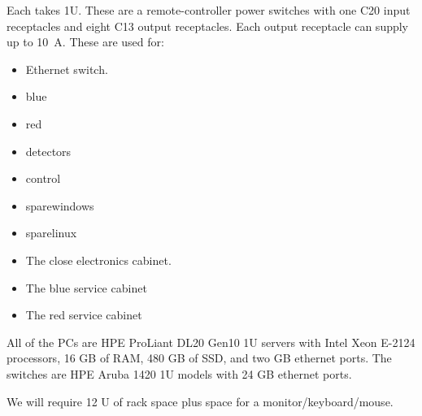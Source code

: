\documentclass{article}
\begin{document}
\begin{itemize}
Each takes 1U. These are a remote-controller power switches with one C20 input receptacles and eight C13 output receptacles.
Each output receptacle can supply up to 10~A.
These are used for:
\begin{itemize}
\item Ethernet switch.
\item blue
\item red
\item detectors
\item control
\item sparewindows
\item sparelinux
\item The close electronics cabinet.
\item The blue service cabinet
\item The red service cabinet
\end{itemize}
\end{itemize}

All of the PCs are HPE ProLiant DL20 Gen10 1U servers with Intel Xeon E-2124 processors, 16 GB of RAM, 480 GB of SSD, and two GB ethernet ports. The switches are HPE Aruba 1420 1U models with 24 GB ethernet ports.



We will require 12 U of rack space plus space for a monitor/keyboard/mouse. 

\end{document}
